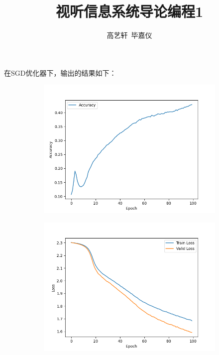 \documentclass[11pt, a4paper]{article}
\title{\Large{\bf{视听信息系统导论编程1}}}
\author{高艺轩\ 毕嘉仪}
\date{}
\begin{document}
\maketitle
\section{}
在SGD优化器下，输出的结果如下：
\begin{figure}[H]
    \hfill
    \begin{subfigure}[t]{0.45\linewidth}
        \includegraphics[width=\textwidth]{img/Q1/Acc.png}
    \end{subfigure}
    \hfill
    \begin{subfigure}[t]{0.45\linewidth}
        \includegraphics[width=\textwidth]{img/Q1/Loss.png}
    \end{subfigure}
    \hfill
\end{figure}
\end{document}
